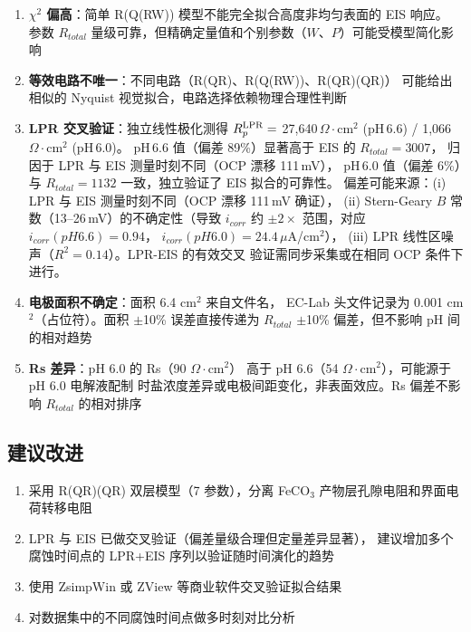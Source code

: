 \documentclass[12pt,a4paper]{ctexart}
\begin{document}
\begin{enumerate}[leftmargin=1.5cm]
  \item \textbf{$\chi^2$ 偏高}：简单 R(Q(RW)) 模型不能完全拟合高度非均匀表面的 EIS 响应。
  参数 $R_{total}$ 量级可靠，但精确定量值和个别参数（$W$、$P$）可能受模型简化影响
  \item \textbf{等效电路不唯一}：不同电路（R(QR)、R(Q(RW))、R(QR)(QR)）
  可能给出相似的 Nyquist 视觉拟合，电路选择依赖物理合理性判断
  \item \textbf{LPR 交叉验证}：独立线性极化测得 $R_p^{\rm LPR} =$
  27,640\,$\Omega\!\cdot\!$cm$^2$ (pH\,6.6) / 1,066\,$\Omega\!\cdot\!$cm$^2$ (pH\,6.0)。
  pH\,6.6 值（偏差 89\%）显著高于 EIS 的 $R_{total}=3007$，
  归因于 LPR 与 EIS 测量时刻不同（OCP 漂移 111\,mV），
  pH\,6.0 值（偏差 6\%）与 $R_{total}=1132$ 一致，独立验证了
  EIS 拟合的可靠性。
  偏差可能来源：(i) LPR 与 EIS 测量时刻不同（OCP 漂移 111\,mV 确证），
  (ii) Stern-Geary $B$ 常数（13--26\,mV）的不确定性（导致 $i_{corr}$ 约
  $\pm 2\times$ 范围，对应 $i_{corr}(pH6.6)=0.94$，
  $i_{corr}(pH6.0)=24.4$\,$\mu$A/cm$^2$），
  (iii) LPR 线性区噪声（$R^2=0.14$）。LPR-EIS 的有效交叉
  验证需同步采集或在相同 OCP 条件下进行。
  \item \textbf{电极面积不确定}：面积 6.4 cm$^2$ 来自文件名，
  EC-Lab 头文件记录为 0.001 cm$^2$（占位符）。面积 $\pm$10\% 误差直接传递为
  $R_{total}$ $\pm$10\% 偏差，但不影响 pH 间的相对趋势
  \item \textbf{Rs 差异}：pH 6.0 的 Rs（90 $\Omega\!\cdot\!$cm$^2$）
  高于 pH 6.6（54 $\Omega\!\cdot\!$cm$^2$），可能源于 pH 6.0 电解液配制
  时盐浓度差异或电极间距变化，非表面效应。Rs 偏差不影响 $R_{total}$ 的相对排序
\end{enumerate}

\subsection{建议改进}

\begin{enumerate}[leftmargin=1.5cm]
  \item 采用 R(QR)(QR) 双层模型（7 参数），分离 FeCO$_3$ 产物层孔隙电阻和界面电荷转移电阻
  \item LPR 与 EIS 已做交叉验证（偏差量级合理但定量差异显著），
  建议增加多个腐蚀时间点的 LPR+EIS 序列以验证随时间演化的趋势
  \item 使用 ZsimpWin 或 ZView 等商业软件交叉验证拟合结果
  \item 对数据集中的不同腐蚀时间点做多时刻对比分析
\end{enumerate}
\end{document}
